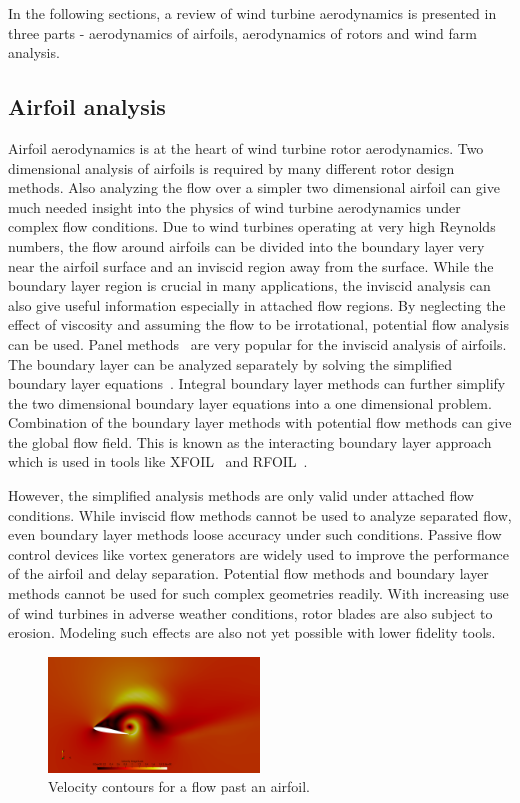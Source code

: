In the following sections, a review of wind turbine aerodynamics is presented in three parts - aerodynamics of airfoils, aerodynamics of rotors and wind farm analysis.

\subsection{Airfoil analysis}\label{ssec:ch1airfoil}
Airfoil aerodynamics is at the heart of wind turbine rotor aerodynamics. Two dimensional analysis of airfoils is required by many different rotor design methods. Also analyzing the flow over a simpler two dimensional airfoil can give much needed insight into the physics of wind turbine aerodynamics under complex flow conditions. Due to wind turbines operating at very high Reynolds numbers, the flow around airfoils can be divided into the boundary layer very near the airfoil surface and an inviscid region away from the surface. While the boundary layer region is crucial in many applications, the inviscid analysis can also give useful information especially in attached flow regions. By neglecting the effect of viscosity and assuming the flow to be irrotational, potential flow analysis can be used. Panel methods~\cite{katz_plotkin_2001} are very popular for the inviscid analysis of airfoils. The boundary layer can be analyzed separately by solving the simplified boundary layer equations~\cite{Lyon2014}. Integral boundary layer methods can further simplify the two dimensional boundary layer equations into a one dimensional problem. Combination of the boundary layer methods with potential flow methods can give the global flow field. This is known as the interacting boundary layer approach~\cite{Ozdemir2020} which is used in tools like XFOIL~\cite{drela1989xfoil} and RFOIL~\cite{rfoil_orig}.

However, the simplified analysis methods are only valid under attached flow conditions. While inviscid flow methods cannot be used to analyze separated flow, even boundary layer methods loose accuracy under such conditions. Passive flow control devices like vortex generators are widely used to improve the performance of the airfoil and delay separation. Potential flow methods and boundary layer methods cannot be used for such complex geometries readily. With increasing use of wind turbines in adverse weather conditions, rotor blades are also subject to erosion. Modeling such effects are also not yet possible with lower fidelity tools. 
\begin{figure}[h!]
\centering
\captionsetup{justification=centering}
 \includegraphics[width=0.5\textwidth]{ch1_introduction/images/airfoil_picture.png}
\caption{Velocity contours for a flow past an airfoil.}
 \label{fig:airfoil}
\end{figure} 

